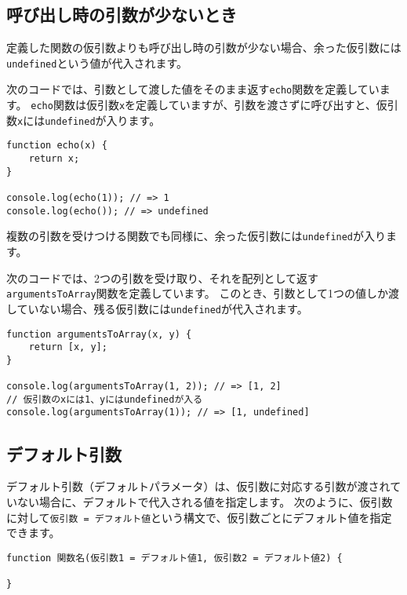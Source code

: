 \hypertarget{function-less-arguments}{%
\subsection{呼び出し時の引数が少ないとき}\label{function-less-arguments}}

定義した関数の仮引数よりも呼び出し時の引数が少ない場合、余った仮引数には\texttt{undefined}という値が代入されます。

次のコードでは、引数として渡した値をそのまま返す\texttt{echo}関数を定義しています。
\texttt{echo}関数は仮引数\texttt{x}を定義していますが、引数を渡さずに呼び出すと、仮引数\texttt{x}には\texttt{undefined}が入ります。

\begin{lstlisting}
function echo(x) {
    return x;
}

console.log(echo(1)); // => 1
console.log(echo()); // => undefined
\end{lstlisting}

複数の引数を受けつける関数でも同様に、余った仮引数には\texttt{undefined}が入ります。

次のコードでは、2つの引数を受け取り、それを配列として返す\texttt{argumentsToArray}関数を定義しています。
このとき、引数として1つの値しか渡していない場合、残る仮引数には\texttt{undefined}が代入されます。

\begin{lstlisting}
function argumentsToArray(x, y) {
    return [x, y];
}

console.log(argumentsToArray(1, 2)); // => [1, 2]
// 仮引数のxには1、yにはundefinedが入る
console.log(argumentsToArray(1)); // => [1, undefined]
\end{lstlisting}

\hypertarget{function-default-parameters}{%
\subsection[デフォルト引数]{デフォルト引数\,\protect{}}\label{function-default-parameters}}

デフォルト引数（デフォルトパラメータ）は、仮引数に対応する引数が渡されていない場合に、デフォルトで代入される値を指定します。
次のように、仮引数に対して\texttt{仮引数 = デフォルト値}という構文で、仮引数ごとにデフォルト値を指定できます。

\begin{lstlisting}
function 関数名(仮引数1 = デフォルト値1, 仮引数2 = デフォルト値2) {

}
\end{lstlisting}

